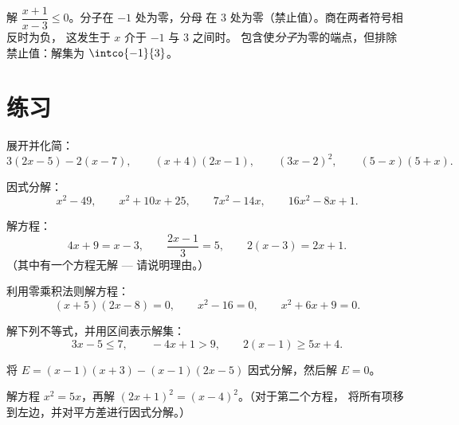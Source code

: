 \begin{example}\label{ex:g10:algebra:quotientineq}
解 $\dfrac{x + 1}{x - 3} \leq 0$。分子在 $-1$ 处为零，分母
在 $3$ 处为零（禁止值）。商在两者符号相反时为负，
这发生于 $x$ 介于 $-1$ 与 $3$ 之间时。
包含使\emph{分子}为零的端点，但排除
禁止值：解集为 $\intco{-1}{3}$。
\end{example}

\section{练习}

\begin{exercise}[$\star$]\label{exo:g10:algebra:1}
展开并化简：
\[
3(2x - 5) - 2(x - 7), \qquad
(x + 4)(2x - 1), \qquad
(3x - 2)^2, \qquad
(5 - x)(5 + x).
\]
\end{exercise}

\begin{exercise}[$\star$]\label{exo:g10:algebra:2}
因式分解：
\[
x^2 - 49, \qquad
x^2 + 10x + 25, \qquad
7x^2 - 14x, \qquad
16x^2 - 8x + 1 .
\]
\end{exercise}

\begin{exercise}[$\star$]\label{exo:g10:algebra:3}
解方程：
\[
4x + 9 = x - 3, \qquad
\frac{2x - 1}{3} = 5, \qquad
2(x - 3) = 2x + 1 .
\]
（其中有一个方程无解 --- 请说明理由。）
\end{exercise}

\begin{exercise}[$\star$]\label{exo:g10:algebra:4}
利用零乘积法则解方程：
\[
(x + 5)(2x - 8) = 0, \qquad
x^2 - 16 = 0, \qquad
x^2 + 6x + 9 = 0 .
\]
\end{exercise}

\begin{exercise}[$\star$]\label{exo:g10:algebra:5}
解下列不等式，并用区间表示解集：
\[
3x - 5 \leq 7, \qquad
-4x + 1 > 9, \qquad
2(x - 1) \geq 5x + 4 .
\]
\end{exercise}

\begin{exercise}[$\star\star$]\label{exo:g10:algebra:6}
       将 $E = (x - 1)(x + 3) - (x - 1)(2x - 5)$ 因式分解，然后解 $E = 0$。
\end{exercise}

\begin{exercise}[$\star\star$]\label{exo:g10:algebra:7}
       解方程 $x^2 = 5x$，再解 $(2x + 1)^2 = (x - 4)^2$。（对于第二个方程，
       将所有项移到左边，并对平方差进行因式分解。）
\end{exercise}


